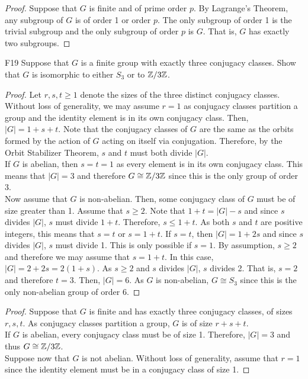 \documentclass[../AlgebraQualSolutions.tex]{subfiles}
\begin{document}
	\begin{proof}
	Suppose that $G$ is finite and of prime order $p$. By Lagrange's Theorem, any subgroup of $G$ is of order 1 or order $p$. The only subgroup of order 1 is the trivial subgroup and the only subgroup of order $p$ is $G$. That is, $G$ has exactly two subgroups.
	\end{proof}
	
	\begin{prob}{F19}{}
	Suppose that $G$ is a finite group with exactly three conjugacy classes. Show that $G$ is isomorphic to either $S_3$ or to $\mathbb{Z}/3\mathbb{Z}$.
	\end{prob}
	
	\begin{proof}
	Let $r,s,t \geq 1$ denote the sizes of the three distinct conjugacy classes. Without loss of generality, we may assume $r = 1$ as conjugacy classes partition a group and the identity element is in its own conjugacy class. Then, $|G| = 1 + s + t$. Note that the conjugacy classes of $G$ are the same as the orbits formed by the action of $G$ acting on itself via conjugation. Therefore, by the Orbit Stabilizer Theorem, $s$ and $t$ must both divide $|G|$.\\
	
	If $G$ is abelian, then $s = t =1$ as every element is in its own conjugacy class. This means that $|G| = 3$ and therefore $G \cong \mathbb{Z}/3\mathbb{Z}$ since this is the only group of order 3.\\
	
	Now assume that $G$ is non-abelian. Then, some conjugacy class of $G$ must be of size greater than 1. Assume that $s \geq 2$. Note that $1 + t = |G| -s$ and since $s$ divides $|G|$, $s$ must divide $1 + t$. Therefore, $s \leq 1 + t$. As both $s$ and $t$ are positive integers, this means that $s = t$ or $s = 1 + t$. If $s = t$, then $|G| = 1 + 2s$ and since $s$ divides $|G|$, $s$ must divide 1. This is only possible if $s = 1$. By assumption, $s \geq 2$ and therefore we may assume that $s = 1 + t$. In this case, $|G| = 2 + 2s = 2(1 + s)$. As $s \geq 2$ and $s$ divides $|G|$, $s$ divides 2. That is, $s = 2$ and therefore $t = 3$. Then, $|G| = 6$. As $G$ is non-abelian, $G \cong S_3$ since this is the only non-abelian group of order 6.
	\end{proof}
	
	\begin{proof}
	Suppose that $G$ is finite and has exactly three conjugacy classes, of sizes $r, s, t$. As conjugacy classes partition a group, $G$ is of size $r + s + t$.\\
	
	If $G$ is abelian, every conjugacy class must be of size 1. Therefore, $|G| = 3$ and thus $G \cong \mathbb{Z}/3\mathbb{Z}$.\\
	
	Suppose now that $G$ is not abelian. Without loss of generality, assume that $r = 1$ since the identity element must be in a conjugacy class of size 1. 
	\end{proof}
	
\end{document}
